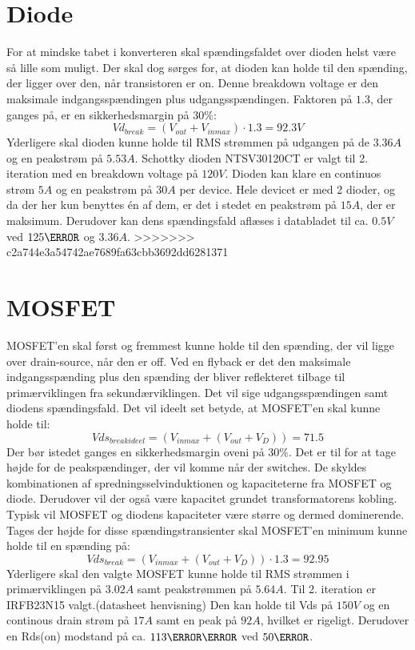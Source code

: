\section{Diode}
For at mindske tabet i konverteren skal spændingsfaldet over dioden helst være så lille som muligt. Der skal dog sørges for, at dioden kan holde til den spænding, der ligger over den, når transistoren er on. Denne breakdown voltage er den maksimale indgangsspændingen plus udgangsspændingen. Faktoren på $1.3$, der ganges på, er en sikkerhedsmargin på $30\percent$:
\begin{equation} \label{Vd_break}
Vd_{break} = (V_{out}+V_{inmax}) \cdot 1.3 = 92.3V
\end{equation}
Yderligere skal dioden kunne holde til RMS strømmen på udgangen på de $3.36A$ og en peakstrøm på $5.53A$.
Schottky dioden NTSV30120CT er valgt til 2. iteration med en breakdown voltage på $120V$. Dioden kan klare en continuos strøm $5A$ og en peakstrøm på $30A$ per device. Hele devicet er med 2 dioder, og da der her kun benyttes én af dem, er det i stedet en peakstrøm på $15A$, der er maksimum. Derudover kan dens spændingsfald aflæses i databladet til ca. $0.5V$ ved $125\degreeCelsius$ og $3.36A$. 
>>>>>>> c2a744e3a54742ae7689fa63cbb3692dd6281371

\section{MOSFET}
MOSFET'en skal først og fremmest kunne holde til den spænding, der vil ligge over drain-source, når den er off. Ved en flyback er det den maksimale indgangsspænding plus den spænding der bliver reflekteret tilbage til primærviklingen fra sekundærviklingen. Det vil sige udgangsspændingen samt diodens spændingsfald. Det vil ideelt set betyde, at MOSFET'en skal kunne holde til:
\begin{equation} \label{Vds_breakideel}
Vds_{breakideel} = (V_{inmax}+(V_{out}+V_D))= 71.5
\end{equation}
Der bør istedet ganges en sikkerhedsmargin oveni på $30\percent$. Det er til for at tage højde for de peakspændinger, der vil komme når der switches. De skyldes kombinationen af spredningsselvinduktionen og kapaciteterne fra MOSFET og diode. Derudover vil der også være kapacitet grundet transformatorens kobling. Typisk vil MOSFET og diodens kapaciteter være større og dermed dominerende. Tages der højde for disse spændingstransienter skal MOSFET'en minimum kunne holde til en spænding på: 
\begin{equation} \label{Vds_break}
Vds_{break} = (V_{inmax}+(V_{out}+V_D)) \cdot 1.3 = 92.95
\end{equation}
Yderligere skal den valgte MOSFET kunne holde til RMS strømmen i primærviklingen på $3.02A$ samt peakstrømmen på $5.64A$.
Til 2. iteration er IRFB23N15 valgt.(datasheet henvisning) Den kan holde til Vds på $150V$ og en continous drain strøm på $17A$ samt en peak på $92A$, hvilket er rigeligt. Derudover en Rds(on) modstand på ca. $113\milli \ohm$ ved $50\degreeCelsius$. 


